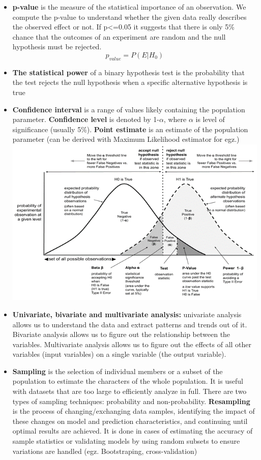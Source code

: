 \documentclass[
  letterpaper,
  DIV=11,
  numbers=noendperiod]{scrreprt}
\begin{document}
\begin{itemize}
\item
  \textbf{p-value} is the measure of the statistical importance of an
  observation. We compute the p-value to understand whether the given
  data really describes the observed effect or not. If p\textless=0.05
  it suggests that there is only 5\% chance that the outcomes of an
  experiment are random and the null hypothesis must be rejected.
  \[ p_{value} = P(E|H_{0}) \]
\item
  \textbf{The statistical power} of a binary hypothesis test is the
  probability that the test rejects the null hypothesis when a specific
  alternative hypothesis is true
\item
  \textbf{Confidence interval} is a range of values likely containing
  the population parameter. \textbf{Confidence level} is denoted by
  1-\(\alpha\), where \(\alpha\) is level of significance (usually 5\%).
  \textbf{Point estimate} is an estimate of the population parameter
  (can be derived with Maximum Likelihood estimator for egz.)
  \includegraphics{Picture7.png}
\item
  \textbf{Univariate, bivariate and multivariate analysis:} univariate
  analysis allows us to understand the data and extract patterns and
  trends out of it. Bivariate analysis allows us to figure out the
  relationship between the variables. Multivariate analysis allows us to
  figure out the effects of all other variables (input variables) on a
  single variable (the output variable).
\item
  \textbf{Sampling} is the selection of individual members or a subset
  of the population to estimate the characters of the whole population.
  It is useful with datasets that are too large to efficiently analyze
  in full. There are two types of sampling techniques: probability and
  non-probability. \textbf{Resampling} is the process of
  changing/exchanging data samples, identifying the impact of these
  changes on model and prediction characteristics, and continuing until
  optimal results are achieved. It is done in cases of estimating the
  accuracy of sample statistics or validating models by using random
  subsets to ensure variations are handled (egz. Bootstraping,
  cross-validation)


\end{itemize}
\end{document}
